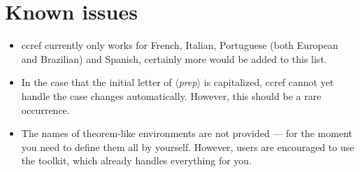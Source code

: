 \documentclass[classical]{einfart}
\providecommand{\meta}[1]{$\langle${\normalfont\itshape#1}$\rangle$}
\newcommand{\ccrefpackage}{\textsf{ccref}}
\begin{document}
\section{Known issues}
\begin{itemize}
    \item \ccrefpackage{} currently only works for French, Italian, Portuguese (both European and Brazilian) and Spanish, certainly more would be added to this list.
    \item In the case that the initial letter of \meta{prep} is capitalized, \ccrefpackage{} cannot yet handle the case changes automatically. However, this should be a rare occurrence.
    \item The names of theorem-like environments are not provided --- for the moment you need to define them all by yourself. However, users are encouraged to use the \ProjLib{} toolkit, which already handles everything for you.
\end{itemize}
\end{document}
